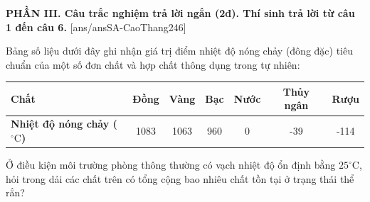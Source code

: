 
\noindent \textbf{PHẦN III. Câu trắc nghiệm trả lời ngắn (2đ). Thí sinh trả lời từ câu 1 đến câu 6.}
[ans/ansSA-CaoThang246]

\begin{ex}%
	Bảng số liệu dưới đây ghi nhận giá trị điểm nhiệt độ nóng chảy (đông đặc) tiêu chuẩn của một số đơn chất và hợp chất thông dụng trong tự nhiên:
	\begin{center}
		\begin{tabular}{|l|c|c|c|c|c|c|}
			\hline
			\textbf{Chất} & \textbf{Đồng} & \textbf{Vàng} & \textbf{Bạc} & \textbf{Nước} & \textbf{Thủy ngân} & \textbf{Rượu} \\ \hline
			\textbf{Nhiệt độ nóng chảy ($^\circ\text{C}$)} & 1083 & 1063 & 960 & 0 & -39 & -114 \\ \hline
		\end{tabular}
	\end{center}
	Ở điều kiện môi trường phòng thông thường có vạch nhiệt độ ổn định bằng $25^\circ\text{C}$, hỏi trong dải các chất trên có tổng cộng bao nhiêu chất tồn tại ở trạng thái thể rắn?
\end{ex}

